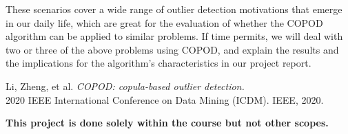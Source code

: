 \documentclass[12pt, a4paper, oneside]{article}
\newcommand{\myspace}[1]{\vspace{#1\baselineskip}}
\begin{document}
\par These scenarios cover a wide range of outlier detection motivations that emerge in our daily life, which are great for the evaluation of whether the COPOD algorithm can be applied to similar problems. If time permits, we will deal with two or three of the above problems using COPOD, and explain the results and the implications for the algorithm’s characteristics in our project report. 
\begin{thebibliography}{99}
Li, Zheng, et al.  \textit{COPOD: copula-based outlier detection.}\\
2020 IEEE International Conference on Data Mining (ICDM). IEEE, 2020.
\end{thebibliography}
\myspace{1}
\textbf{This project is done solely within the course but not other scopes.}
\end{document}
